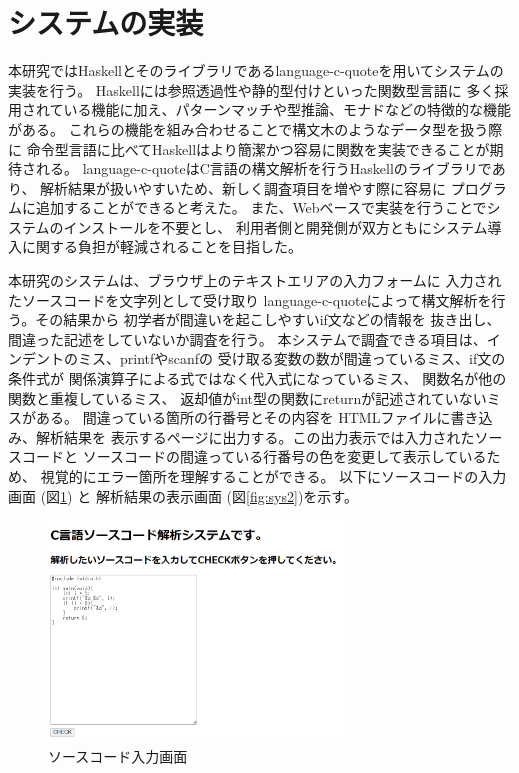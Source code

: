 \documentclass[11pt,twocolumn]{jarticle}
\begin{document}
\section{システムの実装}
本研究ではHaskellとそのライブラリであるlanguage-c-quoteを用いてシステムの実装を行う。
Haskellには参照透過性や静的型付けといった関数型言語に
多く採用されている機能に加え、パターンマッチや型推論、モナドなどの特徴的な機能がある。
これらの機能を組み合わせることで構文木のようなデータ型を扱う際に
命令型言語に比べてHaskellはより簡潔かつ容易に関数を実装できることが期待される。
language-c-quoteはC言語の構文解析を行うHaskellのライブラリであり、
解析結果が扱いやすいため、新しく調査項目を増やす際に容易に
プログラムに追加することができると考えた。
また、Webベースで実装を行うことでシステムのインストールを不要とし、
利用者側と開発側が双方ともにシステム導入に関する負担が軽減されることを目指した。

本研究のシステムは、ブラウザ上のテキストエリアの入力フォームに
入力されたソースコードを文字列として受け取り
language-c-quoteによって構文解析を行う。その結果から
初学者が間違いを起こしやすいif文などの情報を
抜き出し、間違った記述をしていないか調査を行う。
本システムで調査できる項目は、インデントのミス、printfやscanfの
受け取る変数の数が間違っているミス、if文の条件式が
関係演算子による式ではなく代入式になっているミス、
関数名が他の関数と重複しているミス、
返却値がint型の関数にreturnが記述されていないミスがある。
間違っている箇所の行番号とその内容を
HTMLファイルに書き込み、解析結果を
表示するページに出力する。この出力表示では入力されたソースコードと
ソースコードの間違っている行番号の色を変更して表示しているため、
視覚的にエラー箇所を理解することができる。
以下にソースコードの入力画面 (図\ref{fig:sys1}) と
解析結果の表示画面 (図\ref{fig:sys2})を示す。

\begin{figure}[!h]
   \begin{center}
      \includegraphics[width=8cm]{systempage1.png}
      \caption{ソースコード入力画面}
      \label{fig:sys1}
   \end{center}
\end{figure}
\end{document}
